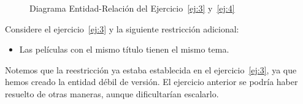 \begin{ejercicio}
\begin{figure}
        \caption{Diagrama Entidad-Relación del Ejercicio~\ref{ej:3} y~\ref{ej:4}}
        \label{fig:ej3}
    \end{figure}
\end{ejercicio}

\begin{ejercicio} \label{ej:4}
    Considere el ejercicio~\ref{ej:3} y la siguiente restricción adicional:
    \begin{itemize}
        \item Las películas con el mismo título tienen el mismo tema.
    \end{itemize}

    Notemos que la reestricción ya estaba establecida en el ejercicio~\ref{ej:3}, ya que hemos creado la entidad débil de versión.
    El ejercicio anterior se podría haber resuelto de otras maneras, aunque dificultarían escalarlo.
\end{ejercicio}

